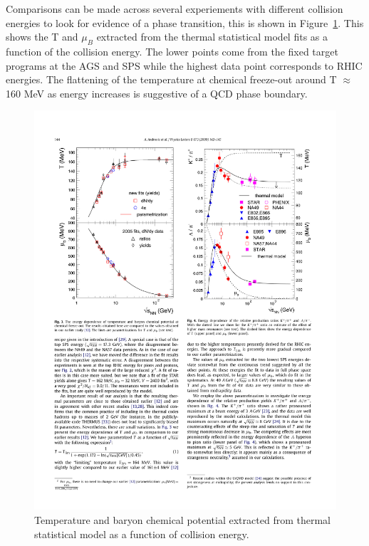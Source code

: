 Comparisons can be made across several experiements with different collision energies to look for evidence of a phase transition, this is shown in Figure~\ref{fig:T_mu}. This shows the T and $\mu_B$ extracted from the thermal statistical model fits as a function of the collision energy. The lower points come from the fixed target programs at the AGS and SPS while the highest data point corresponds to RHIC energies. The flattening of the temperature at chemical freeze-out around T $\approx$ 160 MeV as energy increases is suggestive of a QCD phase boundary.

\begin{figure}[htbp]
\begin{center}
\includegraphics[scale=1.3]{Plots/Intro/freezeout.pdf}
\end{center}
\caption[Freeze-out T and $\mu_B$]{Temperature and baryon chemical potential extracted from thermal statistical model as a function of collision energy.}
\label{fig:T_mu}
\end{figure}

